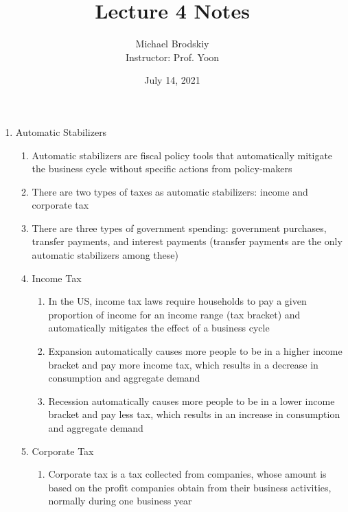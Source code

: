 \documentclass[12pt]{article}
\title{Lecture 4 Notes}
\date{July 14, 2021}
\author{Michael Brodskiy\\ \small Instructor: Prof. Yoon}
\begin{document}
    \maketitle

    \begin{enumerate}

      \item Automatic Stabilizers

        \begin{enumerate}

          \item Automatic stabilizers are fiscal policy tools that automatically mitigate the business cycle without specific actions from policy-makers

          \item There are two types of taxes as automatic stabilizers: income and corporate tax

          \item There are three types of government spending: government purchases, transfer payments, and interest payments (transfer payments are the only automatic stabilizers among these)

          \item Income Tax

            \begin{enumerate}

              \item In the US, income tax laws require households to pay a given proportion of income for an income range (tax bracket) and automatically mitigates the effect of a business cycle

              \item Expansion automatically causes more people to be in a higher income bracket and pay more income tax, which results in a decrease in consumption and aggregate demand

              \item Recession automatically causes more people to be in a lower income bracket and pay less tax, which results in an increase in consumption and aggregate demand

            \end{enumerate}

          \item Corporate Tax

            \begin{enumerate}

              \item Corporate tax is a tax collected from companies, whose amount is based on the profit companies obtain from their business activities, normally during one business year


\end{enumerate}
\end{enumerate}
\end{enumerate}
\end{document}
